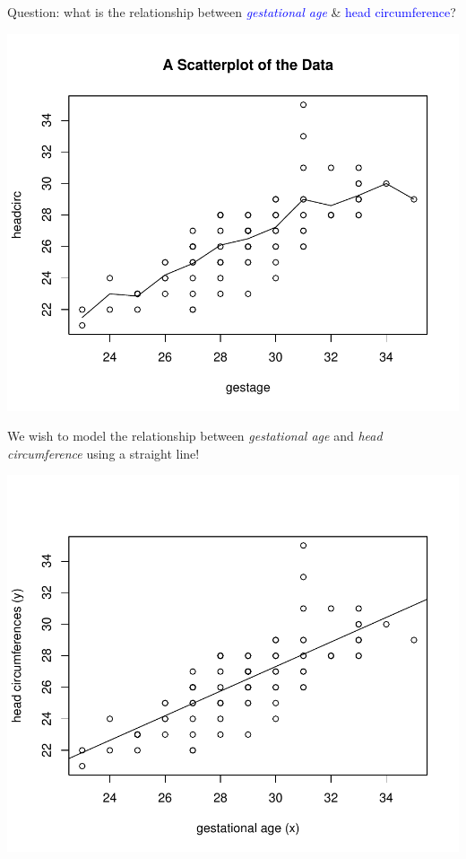 \documentclass[final]{article}\usepackage[]{graphicx}\usepackage[svgnames]{xcolor}
\makeatletter
\def\maxwidth{ %
  \ifdim\Gin@nat@width>\linewidth
    \linewidth
  \else
    \Gin@nat@width
  \fi
}
\newenvironment{knitrout}{}{} %
\makeatother
\begin{document}
Question: what is the relationship between \textcolor{Blue}{\emph{gestational age}} \& \textcolor{Blue}{head circumference}?
\begin{knitrout}
\color{fgcolor}

{\centering \includegraphics[width=\maxwidth]{figure/unnamed-chunk-7-1} 

}


\end{knitrout}
We wish to model the relationship between \emph{gestational age} and \emph{head
    circumference} using a straight line!
\begin{knitrout}
\color{fgcolor}

{\centering \includegraphics[width=\maxwidth]{figure/unnamed-chunk-8-1} 

}


\end{knitrout}
\end{document}

